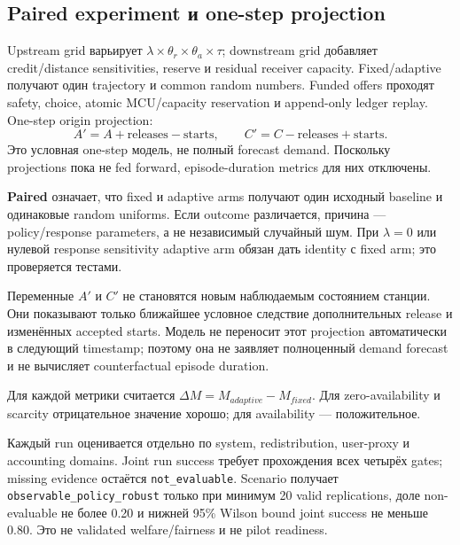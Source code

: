 \documentclass[11pt,a4paper]{article}
\newcommand{\term}[1]{\textbf{#1}}
\newcommand{\code}[1]{\texttt{#1}}
\begin{document}
\subsection{Paired experiment и one-step projection}
Upstream grid варьирует $\lambda\times\theta_r\times\theta_a\times\tau$; downstream grid добавляет credit/distance sensitivities, reserve и residual receiver capacity. Fixed/adaptive получают один trajectory и common random numbers. Funded offers проходят safety, choice, atomic MCU/capacity reservation и append-only ledger replay. One-step origin projection:
\[
A'=A+\text{releases}-\text{starts},\qquad C'=C-\text{releases}+\text{starts}.
\]
Это условная one-step модель, не полный forecast demand. Поскольку projections пока не fed forward, episode-duration metrics для них отключены.

\term{Paired} означает, что fixed и adaptive arms получают один исходный baseline и одинаковые random uniforms. Если outcome различается, причина --- policy/response parameters, а не независимый случайный шум. При $\lambda=0$ или нулевой response sensitivity adaptive arm обязан дать identity с fixed arm; это проверяется тестами.

Переменные $A'$ и $C'$ не становятся новым наблюдаемым состоянием станции. Они показывают только ближайшее условное следствие дополнительных release и изменённых accepted starts. Модель не переносит этот projection автоматически в следующий timestamp; поэтому она не заявляет полноценный demand forecast и не вычисляет counterfactual episode duration.

Для каждой метрики считается $\Delta M=M_{adaptive}-M_{fixed}$. Для zero-availability и scarcity отрицательное значение хорошо; для availability --- положительное.

Каждый run оценивается отдельно по system, redistribution, user-proxy и accounting domains. Joint run success требует прохождения всех четырёх gates; missing evidence остаётся \code{not\_evaluable}. Scenario получает \code{observable\_policy\_robust} только при минимум 20 valid replications, доле non-evaluable не более 0.20 и нижней 95\% Wilson bound joint success не меньше 0.80. Это не validated welfare/fairness и не pilot readiness.
\end{document}
